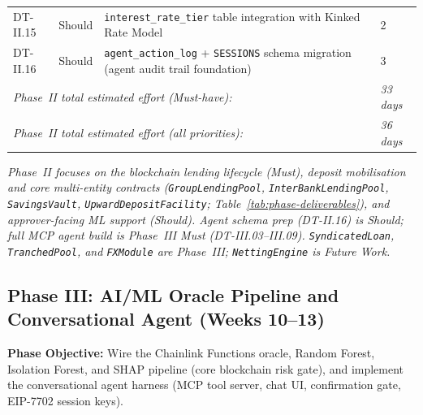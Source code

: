 \documentclass[12pt,a4paper]{report}
\begin{document}
\begin{table}[H]
\begin{tabular}{p{1.8cm}p{1.8cm}p{7.5cm}p{1.5cm}}
DT-II.15 & Should & \texttt{interest\_rate\_tier} table integration with Kinked Rate Model & 2 \\
DT-II.16 & Should & \texttt{agent\_action\_log} + \texttt{SESSIONS} schema migration (agent audit trail foundation) & 3 \\
\multicolumn{3}{l}{\textit{Phase~II total estimated effort (Must-have):}} & \textit{33 days} \\
\multicolumn{3}{l}{\textit{Phase~II total estimated effort (all priorities):}} & \textit{36 days} \\
\bottomrule
\end{tabular}
\end{table}

\vspace{2pt}
\noindent\textit{\small Phase~II focuses on the blockchain lending lifecycle (Must), deposit mobilisation and core multi-entity contracts (\texttt{GroupLendingPool}, \texttt{InterBankLendingPool}, \texttt{SavingsVault}, \texttt{UpwardDepositFacility}; Table~\ref{tab:phase-deliverables}), and approver-facing ML support (Should). Agent schema prep (DT-II.16) is Should; full MCP agent build is Phase~III Must (DT-III.03--III.09). \texttt{SyndicatedLoan}, \texttt{TranchedPool}, and \texttt{FXModule} are Phase~III; \texttt{NettingEngine} is Future Work.}


\subsection{Phase III: AI/ML Oracle Pipeline and Conversational Agent (Weeks 10--13)}

\textbf{Phase Objective:} Wire the Chainlink Functions oracle, Random Forest,
Isolation Forest, and SHAP pipeline (core blockchain risk gate), and implement the conversational agent harness (MCP tool server, chat UI, confirmation gate, EIP-7702 session keys).
\end{document}
